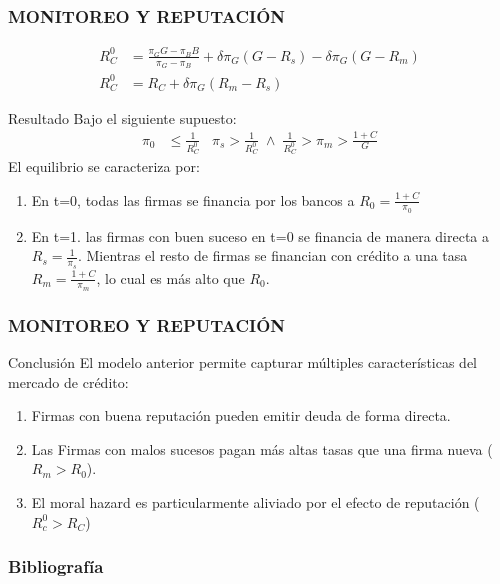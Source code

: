 \documentclass[10pt, xcolor=table, x11names]{beamer}
\begin{document}
\begin{frame}
    \frametitle{{\normalsize MONITOREO Y REPUTACIÓN} {}}
   \begin{align}
    R_{C}^{0}&=\frac{\pi_{G}G-\pi_{B}B}{\pi_{G}-\pi_{B}}+\delta \pi_{G}(G-R_{s})-\delta \pi_{G}(G-R_{m})\nonumber \\
    R_{C}^{0}&=R_{C}+\delta \pi_{G}(R_{m}-R_{s})  
   \end{align}
   
  \begin{block} {Resultado}
  Bajo el siguiente supuesto:
    \begin{align}
    \pi_{0}&\leq \frac{1}{R_{C}^{0}}\;\;\;\pi_{s}> \frac{1}{R_{C}^{0}}\;\wedge\;\frac{1}{R_{C}^{0}}>\pi_{m}>\frac{1+C}{G}
    \end{align}  
    El equilibrio se caracteriza por:
    \begin{enumerate}
        \item En t=0, todas las firmas se financia por los bancos a $R_{0}=\frac{1+C}{\pi_{0}}$
        \item En t=1. las firmas con buen suceso en t=0 se financia de manera directa a 
        $R_{s}=\frac{1}{\pi_{s}}$. Mientras el resto de firmas se financian con crédito a una tasa $R_{m}=\frac{1+C}{\pi_{m}}$, lo cual es más alto que $R_{0}$.
        
    \end{enumerate}  
  \end{block}	
   
\end{frame}


\begin{frame}
    \frametitle{{\normalsize MONITOREO Y REPUTACIÓN} {}}
      
    \begin{block} {Conclusión}
        El modelo anterior permite capturar múltiples características del mercado de crédito:
       \begin{enumerate}
           \item Firmas con buena reputación pueden emitir deuda de forma directa.
           \item Las Firmas con malos sucesos pagan más altas tasas que una firma nueva ($ R_{m}>R_{0}$).
           \item El moral hazard es particularmente aliviado por el efecto de reputación  ($R_{c}^{0}>R_{C}$)
       \end{enumerate}
    \end{block}	
    
\end{frame}

	\begin{frame}[allowframebreaks]
    \frametitle{{\large 
            Bibliografía}}
    \renewcommand{\refname}{Referencias}
    
    
\end{frame}
\end{document}
